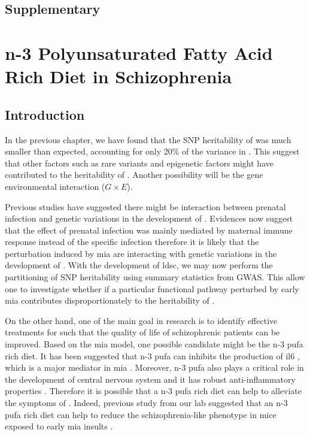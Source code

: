 \documentclass[12pt]{scrbook}
\newcommand*{\glng}{\glsentrylong}
\begin{document}

\begin{singlespace}
	\section{Supplementary}
	
	
	
\end{singlespace}

\chapter{n-3 Polyunsaturated Fatty Acid Rich Diet in Schizophrenia}
\label{omegaProject}
\section{Introduction}
In the previous chapter, we have found that the \gls{SNP} heritability of \glng{scz} was much smaller than expected, accounting for only 20\% of the variance in \glng{scz}.
This suggest that other factors such as rare variants and epigenetic factors might have contributed to the heritability of \glng{scz}.
Another possibility will be the gene environmental interaction ($G\times E$).

Previous studies have suggested there might be interaction between prenatal infection and genetic variations in the development of \glng{scz} \citep{Tienari2004,Clarke2009}.
Evidences now suggest that the effect of prenatal infection was mainly mediated by maternal immune response instead of the specific infection \citep{Brown2010} therefore it is likely that the perturbation induced by \gls{mia} are interacting with genetic variations in the development of \glng{scz}.
With the development of \gls{ldsc}, we may now perform the partitioning of \gls{SNP} heritability using summary statistics from \gls{GWAS}. 
This allow one to investigate whether if a particular functional pathway perturbed by early \gls{mia} contributes disproportionately to the heritability of \glng{scz}.

On the other hand, one of the main goal in \glng{scz} research is to identify effective treatments for \glng{scz} such that the quality of life of schizophrenic patients can be improved. 
Based on the \gls{mia} model, one possible candidate might be the n-3 \gls{pufa} rich diet. 
It has been suggested that n-3 \gls{pufa} can inhibits the production of \gls{il6} \citep{Trebble2003}, which is a major mediator in \gls{mia} \citep{Smith2007}.
Moreover, n-3 \gls{pufa} also plays a critical role in the development of central nervous system \citep{Clandinin1999} and it has robust anti-inflammatory properties \citep{Trebble2003}.
Therefore it is possible that a n-3 \gls{pufa} rich diet can help to alleviate the symptoms of \glng{scz}.
Indeed, previous study from our lab suggested that an n-3 \gls{pufa} rich diet can help to reduce the schizophrenia-like phenotype in mice exposed to early \gls{mia} insults \citep{Li2015}.
\end{document}
